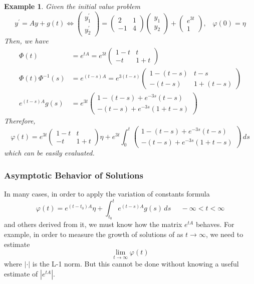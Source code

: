 \documentclass{article}
\newtheorem{example}{Example}[section]
\theoremstyle{remark}
\theoremstyle{definition}
\begin{document}
\begin{example}
Given the initial value problem 
\[y^\prime = Ay + g(t) \iff \begin{pmatrix} y_1 ^\prime \\ y_2^\prime \end{pmatrix} = \begin{pmatrix} 2 & 1 \\ -1 & 4 \end{pmatrix} \begin{pmatrix} y_1 \\ y_2 \end{pmatrix} + \begin{pmatrix} e^{3t} \\ 1 \end{pmatrix}, \;\;\; \varphi(0) = \eta\]
Then, we have
\begin{align*}
    \Phi(t) & = e^{tA} = e^{3t} \begin{pmatrix} 1-t & t \\ -t & 1+t \end{pmatrix} \\
    \Phi(t) \Phi^{-1} (s) & = e^{(t-s)A} = e^{3(t-s)} \begin{pmatrix} 1 - (t-s) & t-s \\ -(t-s) & 1+(t-s) \end{pmatrix} \\
    e^{(t-s)A} g(s) & = e^{3t} \begin{pmatrix}
    1-(t-s)+e^{-3s}(t-s) \\ -(t-s) + e^{-3s} (1+t-s)\end{pmatrix}
\end{align*}
Therefore, 
\[\varphi(t) = e^{3t} \begin{pmatrix} 1-t & t \\ -t & 1+t \end{pmatrix} \eta + e^{3t} \int_{0}^t \begin{pmatrix} 1-(t-s) + e^{-3s} (t-s) \\
-(t-s) + e^{-3s}(1+t-s) \end{pmatrix} \,ds\]
which can be easily evaluated. 
\end{example}

\subsubsection{Asymptotic Behavior of Solutions}
In many cases, in order to apply the variation of constants formula 
\[\varphi(t) = e^{(t - t_0)A} \eta + \int_{t_0}^t e^{(t-s)A} g(s) \,ds \;\;\;\;\; -\infty < t< \infty\]
and others derived from it, we must know how the matrix $e^{tA}$ behaves. For example, in order to measure the growth of solutions of as $t \rightarrow \infty$, we need to estimate 
\[\lim_{t\rightarrow \infty} \varphi(t)\]
where $|\cdot|$ is the L-1 norm. But this cannot be done without knowing a useful estimate of $|e^{tA}|$. 
\end{document}
